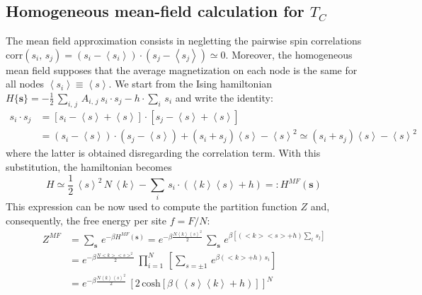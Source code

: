 \subsection*{Homogeneous mean-field calculation for $T_C$ } \label{app:mean_field}
{\small
The mean field approximation consists in negletting the pairwise spin correlations $
    \text{corr}(s_i,\,s_j) = (s_i - \left\langle s_i \right \rangle)\cdot (s_j - \left\langle s_j \right \rangle)\simeq 0 $.
Moreover, the homogeneous mean field supposes that the average magnetization on each node is the same for all nodes $\left\langle s_i\right\rangle \equiv \left \langle s \right \rangle$. We start from the Ising hamiltonian $H\{\mathbf{s}\} = -\frac{1}{2}\, \sum_{i,\,j}\,A_{i,\,j}\,s_i\cdot s_j - h\cdot\sum_{i}\,s_i$ and write the identity: 
\begin{align*}
    s_i\cdot s_j &= [s_i - \left\langle s \right \rangle + \left\langle s \right \rangle]\cdot [s_j - \left\langle s \right \rangle + \left\langle s \right \rangle] \\
    &= (s_i - \left\langle s \right \rangle)\cdot (s_j-\left\langle s \right \rangle) + (s_i + s_j) \left\langle s \right \rangle - \left\langle s \right \rangle^2 \simeq (s_i + s_j) \left\langle s \right \rangle - \left\langle s \right \rangle^2
\end{align*} where the latter is obtained disregarding the correlation term. With this substitution, the hamiltonian becomes 
\begin{equation*}
    H \simeq\frac{1}{2}\,\left\langle s \right \rangle^2\,N\,\left\langle k \right \rangle - \sum_i\,s_i\cdot (\left\langle k \right \rangle\left\langle s \right \rangle + h)=: H^{MF}(\mathbf{s})
\end{equation*}
This expression can be now used to compute the partition function $Z$ and, consequently, the free energy per site $f= F/N$:
\begin{align*}
    Z^{MF} &= \sum_{\mathbf{s}}\, e^{-\beta H^{MF}(\mathbf{s})} = e^{-\beta \frac{N \left\langle k \right \rangle\left\langle s \right \rangle^2}{2}}\, \sum_{\mathbf{s}}\, e^{\beta\left[(<k><s> + h)\sum_l\,s_l\right]} \\
    &= e^{-\beta \frac{N <k><s>^2}{2}}\, \prod_{i=1}^{N}\, \left[ \sum_{s = \pm 1}\, e^{\beta(<k>+h)\,s_i} \right] \\
    &= e^{-\beta \frac{N \left\langle k \right \rangle\left\langle s \right \rangle^2}{2}}\,\left[2\,\text{cosh}\left[\beta(\left\langle s \right \rangle\left\langle k \right \rangle+h)\right]\right]^N \\

\end{align*}}
